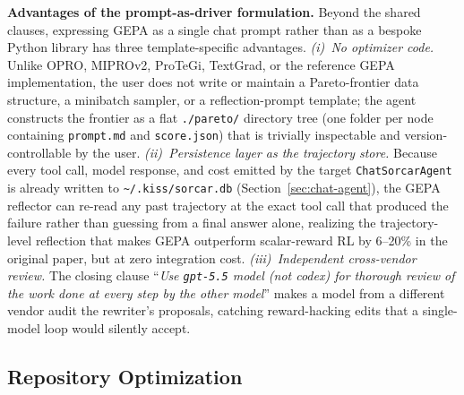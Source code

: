 \documentclass{article}
\begin{document}
\textbf{Advantages of the prompt-as-driver formulation.}  Beyond the shared clauses, expressing GEPA as a single chat prompt rather than as a bespoke Python library has three template-specific advantages.  \emph{(i)~No optimizer code.}  Unlike OPRO, MIPROv2, ProTeGi, TextGrad, or the reference GEPA implementation, the user does not write or maintain a Pareto-frontier data structure, a minibatch sampler, or a reflection-prompt template; the agent constructs the frontier as a flat \texttt{./pareto/} directory tree (one folder per node containing \texttt{prompt.md} and \texttt{score.json}) that is trivially inspectable and version-controllable by the user.  \emph{(ii)~Persistence layer as the trajectory store.}  Because every tool call, model response, and cost emitted by the target \texttt{ChatSorcarAgent} is already written to \texttt{\textasciitilde/.kiss/sorcar.db} (Section~\ref{sec:chat-agent}), the GEPA reflector can re-read any past trajectory at the exact tool call that produced the failure rather than guessing from a final answer alone, realizing the trajectory-level reflection that makes GEPA outperform scalar-reward RL by 6--20\% in the original paper, but at zero integration cost.  \emph{(iii)~Independent cross-vendor review.}  The closing clause ``\emph{Use \texttt{gpt-5.5} model (not codex) for thorough review of the work done at every step by the other model}'' makes a model from a different vendor audit the rewriter's proposals, catching reward-hacking edits that a single-model loop would silently accept.

\subsection{Repository Optimization}
\label{sec:repo-opt}
\end{document}
